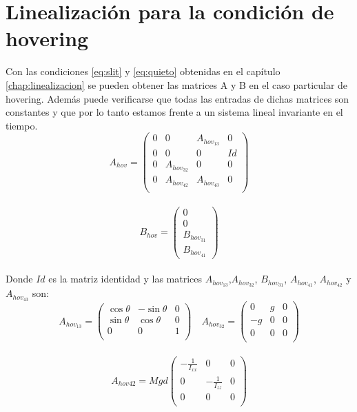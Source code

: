 \section{Linealizaci\'on para la condici\'on de hovering}
Con las condiciones \ref{eq:slit} y \ref{eq:quieto} obtenidas en el cap\'itulo \ref{chap:linealizacion} se pueden obtener las matrices A y B en el caso particular de hovering. Adem\'as puede verificarse que todas las entradas de dichas matrices son constantes y que por lo tanto estamos frente a un sistema lineal invariante en el tiempo.
\begin{equation}
\label{eq:Ahov}
A_{hov}=\left(\begin{array}{cccc}
0 & 0 & A_{hov_{13}} & 0 \\
0 & 0 & 0      & Id\\
0 & A_{hov_{32}} & 0 & 0\\
0 & A_{hov_{42}}      & A_{hov_{43}} & 0 \\    
\end{array}\right)
\end{equation}\\


\begin{equation}
\label{eq:Bhov}
B_{hov}=\left(\begin{array}{c}
0\\
0\\
B_{hov_{31}}\\
B_{hov_{41}} 
\end{array}\right)
\end{equation}\\

Donde $Id$ es la matriz identidad y las matrices $A_{hov_{13}}$,$A_{hov_{32}}$, $B_{hov_{31}}$, $A_{hov_{41}}$, $A_{hov_{42}}$ y $A_{hov_{43}}$ son:
\begin{equation}
A_{hov_{13}}=\left(\begin{array}{ccc}
\cos\theta & -\sin\theta & 0 \\
\sin\theta & \cos\theta & 0\\
0 & 0 &1\\
\end{array}\right) \quad 
A_{hov_{32}}=\left(\begin{array}{ccc}
0 & g & 0 \\
-g & 0 & 0\\
0 & 0 &0\\
\end{array}\right)
\end{equation}\\
\begin{equation}
A_{hov{42}} =Mgd\left(\begin{array}{ccc}
-\frac{1}{I_{xx}} & 0 & 0 \\
0 & -\frac{1}{I_{zz}} & 0\\
0 & 0 &0\\
\end{array}\right)
\end{equation}

